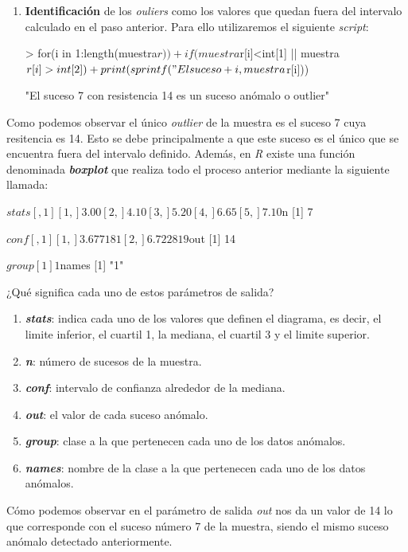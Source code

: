 \documentclass [a4paper] {article}
\begin{document}
\begin{enumerate}
	\item \textbf{Identificación} de los \textit{ouliers} como los valores que quedan fuera del intervalo
	      calculado en el paso anterior. Para ello utilizaremos el siguiente \textit{script}:
\begin{Schunk}
\begin{Sinput}
> for(i in 1:length(muestra$r))
+ 	if(muestra$r[i]<int[1] || muestra$r[i]>int[2])
+ 		print(sprintf("El suceso %d con resistencia %d es un suceso anómalo o outlier",
+ 		      i,muestra$r[i]))
\end{Sinput}
\begin{Soutput}
[1] "El suceso 7 con resistencia 14 es un suceso anómalo o outlier"
\end{Soutput}
\end{Schunk}
\end{enumerate}
Como podemos observar el único \textit{outlier} de la muestra es el suceso 7 cuya resitencia es 14.
Esto se debe principalmente a que este suceso es el único que se encuentra fuera del intervalo definido.
\newline
Además, en \textit{R} existe una función denominada \textbf{\textit{boxplot}} que realiza todo el proceso anterior
mediante la siguiente llamada:
\begin{Schunk}
\begin{Soutput}
$stats
     [,1]
[1,] 3.00
[2,] 4.10
[3,] 5.20
[4,] 6.65
[5,] 7.10

$n
[1] 7

$conf
         [,1]
[1,] 3.677181
[2,] 6.722819

$out
[1] 14

$group
[1] 1

$names
[1] "1"
\end{Soutput}
\end{Schunk}
¿Qué significa cada uno de estos parámetros de salida?
\begin{enumerate}
	\item \textbf{\textit{stats}}: indica cada uno de los valores que definen el diagrama, es decir,
	      el limite inferior, el cuartil 1, la mediana, el cuartil 3 y el limite superior.
	\item \textbf{\textit{n}}: número de sucesos de la muestra.
	\item \textbf{\textit{conf}}: intervalo de confianza alrededor de la mediana.
	\item \textbf{\textit{out}}: el valor de cada suceso anómalo.
	\item \textbf{\textit{group}}: clase a la que pertenecen cada uno de los datos anómalos.
	\item \textbf{\textit{names}}: nombre de la clase a la que pertenecen cada uno de los datos anómalos.
\end{enumerate}
Cómo podemos observar en el parámetro de salida \textit{out} nos da un valor de 14 lo que corresponde con
el suceso número 7 de la muestra, siendo el mismo suceso anómalo detectado anteriormente.
\end{document}
